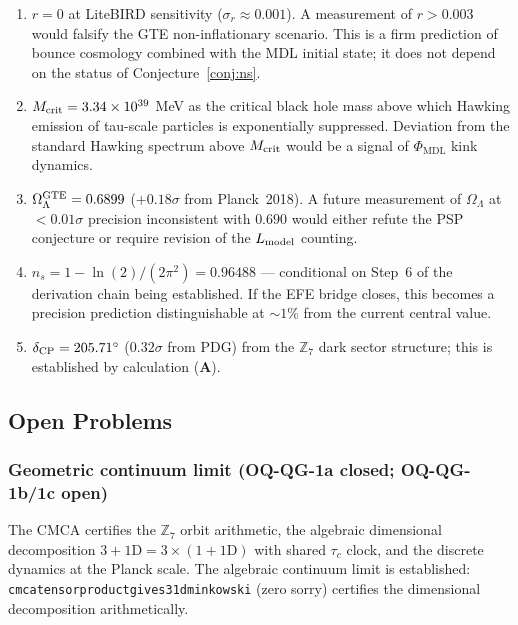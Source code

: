 \documentclass[11pt]{article}
\theoremstyle{remark}
\newcommand{\PHIMDL}{\Phi_{\mathrm{MDL}}}
\newcommand{\ZS}{\mathbb{Z}_7}
\newcommand{\lean}[1]{%
  \penalty-100
  \begingroup\def\_{\textunderscore\allowbreak}\texttt{#1}\endgroup}
\newcommand{\Omegalam}{\Omega_\Lambda}
\newcommand{\CatA}{\textbf{A}}
\begin{document}
\begin{enumerate}
\item $r = 0$ at LiteBIRD sensitivity ($\sigma_r\approx 0.001$).  A measurement of
  $r>0.003$ would falsify the GTE non-inflationary scenario.  This is a firm prediction
  of bounce cosmology combined with the MDL initial state; it does not depend on the
  status of Conjecture~\ref{conj:ns}.

\item $M_{\rm crit} = 3.34\times10^{39}$ MeV as the critical black hole mass above
  which Hawking emission of tau-scale particles is exponentially suppressed.  Deviation
  from the standard Hawking spectrum above $M_{\rm crit}$ would be a signal of
  $\PHIMDL$ kink dynamics.

\item $\Omegalam^{\rm GTE} = 0.6899$ ($+0.18\sigma$ from Planck~2018).  A future
  measurement of $\Omegalam$ at $<0.01\sigma$ precision inconsistent with $0.690$ would
  either refute the PSP conjecture or require revision of the $L_{\rm model}$ counting.

\item $n_s = 1 - \ln(2)/(2\pi^2) = 0.96488$ --- conditional on Step~6 of the
  derivation chain being established.  If the EFE bridge closes, this becomes a
  precision prediction distinguishable at $\sim 1\%$ from the current central value.

\item $\delta_{\rm CP} = 205.71^\circ$ ($0.32\sigma$ from PDG) from the $\ZS$ dark
  sector structure; this is established by calculation ($\CatA$).
\end{enumerate}

\subsection{Open Problems}
\label{sec:open}

\subsubsection{Geometric continuum limit (OQ-QG-1a closed; OQ-QG-1b/1c open)}

The CMCA certifies the $\ZS$
orbit arithmetic, the algebraic dimensional decomposition
$3+1\text{D} = 3\times(1+1\text{D})$ with shared $\tau_c$ clock, and the discrete
dynamics at the Planck scale.  The algebraic continuum limit is established:
\lean{cmca\_tensor\_product\_gives\_31d\_minkowski} (zero sorry) certifies the
dimensional decomposition arithmetically.
\end{document}

